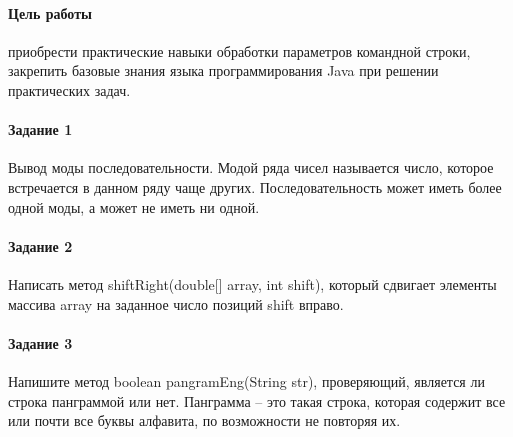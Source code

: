 \newcommand{\baseFile}{../../src/ssp_po5/reports/Karnasevich/1/src/main1/Application.java}

\paragraph{Цель работы}
приобрести практические навыки обработки параметров командной строки, закрепить базовые
знания языка программирования Java при решении практических задач.

\paragraph{Задание 1}
Вывод моды последовательности. Модой ряда чисел называется число, которое встречается в
данном ряду чаще других. Последовательность может иметь более одной моды, а может не
иметь ни одной.



\paragraph{Задание 2}
Написать метод shiftRight(double[] array, int shift), который сдвигает элементы массива
array на заданное число позиций shift вправо.



\paragraph{Задание 3}
Напишите метод boolean pangramEng(String str), проверяющий, является ли строка панграммой или нет.
Панграмма – это такая строка, которая содержит все или почти все буквы алфавита, по возможности не повторяя их.

